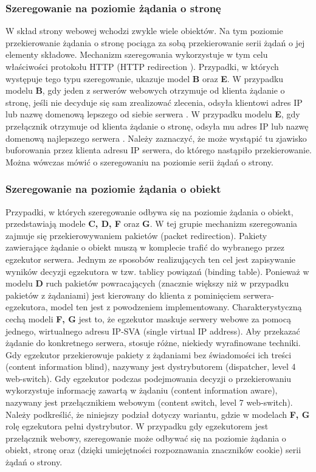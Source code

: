 \subsubsection{Szeregowanie na poziomie żądania o stronę}
W skład strony webowej wchodzi zwykle wiele obiektów. Na tym poziomie przekierowanie żądania o stronę pociąga za sobą 
przekierowanie serii żądań o jej elementy składowe. Mechanizm szeregowania wykorzystuje w tym celu właściwości protokołu HTTP 
(HTTP redirection \cite{modele18}). Przypadki, w których występuje tego typu szeregowanie, ukazuje model {\bf B} oraz {\bf E}. W przypadku modelu {\bf B}, gdy jeden 
z serwerów webowych otrzymuje od klienta żądanie o stronę, jeśli nie decyduje się sam zrealizować zlecenia, 
odsyła klientowi adres IP lub nazwę domenową lepszego od siebie serwera \cite{modele23}. W przypadku modelu {\bf E}, gdy przełącznik otrzymuje 
od klienta żądanie o stronę, odsyła mu adres IP lub nazwę domenową najlepszego serwera \cite{modele19}. 
Należy zaznaczyć, że może wystąpić tu zjawisko buforowania przez klienta adresu IP serwera, do którego nastąpiło 
przekierowanie. Można wówczas mówić o szeregowaniu na poziomie serii żądań o strony.

\subsubsection{Szeregowanie na poziomie żądania o obiekt}
Przypadki, w których szeregowanie odbywa się na poziomie żądania o obiekt, przedstawiają modele {\bf C, D, F} oraz {\bf G}. W tej grupie 
mechanizm szeregowania zajmuje się przekierowywaniem pakietów (packet redirection). Pakiety zawierające żądanie o obiekt muszą
w komplecie trafić do wybranego przez egzekutor serwera. Jednym ze sposobów realizujących ten cel jest zapisywanie wyników 
decyzji egzekutora w tzw. tablicy powiązań (binding table).
Ponieważ w modelu {\bf D} ruch pakietów powracających (znacznie 
większy niż w przypadku pakietów z żądaniami) jest kierowany do klienta z pominięciem serwera-egzekutora, model ten jest z 
powodzeniem implementowany. Charakterystyczną cechą modeli {\bf F, G} jest to, że egzekutor maskuje serwery webowe za pomocą 
jednego, wirtualnego adresu IP-SVA (single virtual IP address). Aby przekazać żądanie do konkretnego serwera, stosuje różne, 
niekiedy wyrafinowane techniki. Gdy egzekutor przekierowuje pakiety z żądaniami bez świadomości ich treści (content 
information blind), nazywany jest dystrybutorem (dispatcher, level 4 web-switch). Gdy egzekutor podczas podejmowania decyzji o 
przekierowaniu wykorzystuje informację zawartą w żądaniu (content information aware), nazywany jest przełącznikiem webowym 
(content switch, level 7 web-switch).
Należy podkreślić, że niniejszy podział dotyczy wariantu, gdzie w modelach {\bf F, G} rolę egzekutora pełni dystrybutor. 
W przypadku gdy egzekutorem jest przełącznik webowy, szeregowanie może odbywać się na poziomie żądania o obiekt, stronę oraz 
(dzięki umiejętności rozpoznawania znaczników cookie) serii żądań o strony.

